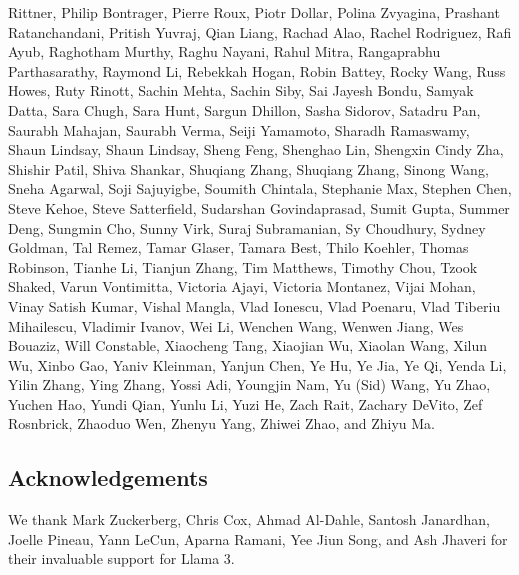 \documentclass[dvipsnames]{fairmeta}
\begin{document}
Rittner, Philip Bontrager, Pierre Roux, Piotr Dollar, Polina Zvyagina, Prashant Ratanchandani, Pritish Yuvraj, Qian Liang, Rachad Alao, Rachel Rodriguez, Rafi Ayub, Raghotham Murthy, Raghu Nayani, Rahul Mitra, Rangaprabhu Parthasarathy, Raymond Li, Rebekkah Hogan, Robin Battey, Rocky Wang, Russ Howes, Ruty Rinott, Sachin Mehta, Sachin Siby, Sai Jayesh Bondu, Samyak Datta, Sara Chugh, Sara Hunt, Sargun Dhillon, Sasha Sidorov, Satadru Pan, Saurabh Mahajan, Saurabh Verma, Seiji Yamamoto, Sharadh Ramaswamy, Shaun Lindsay, Shaun Lindsay, Sheng Feng, Shenghao Lin, Shengxin Cindy Zha, Shishir Patil, Shiva Shankar, Shuqiang Zhang, Shuqiang Zhang, Sinong Wang, Sneha Agarwal, Soji Sajuyigbe, Soumith Chintala, Stephanie Max, Stephen Chen, Steve Kehoe, Steve Satterfield, Sudarshan Govindaprasad, Sumit Gupta, Summer Deng, Sungmin Cho, Sunny Virk, Suraj Subramanian, Sy Choudhury, Sydney Goldman, Tal Remez, Tamar Glaser, Tamara Best, Thilo Koehler, Thomas Robinson, Tianhe Li, Tianjun Zhang, Tim Matthews, Timothy Chou, Tzook Shaked, Varun Vontimitta, Victoria Ajayi, Victoria Montanez, Vijai Mohan, Vinay Satish Kumar, Vishal Mangla, Vlad Ionescu, Vlad Poenaru, Vlad Tiberiu Mihailescu, Vladimir Ivanov, Wei Li, Wenchen Wang, Wenwen Jiang, Wes Bouaziz, Will Constable, Xiaocheng Tang, Xiaojian Wu, Xiaolan Wang, Xilun Wu, Xinbo Gao, Yaniv Kleinman, Yanjun Chen, Ye Hu, Ye Jia, Ye Qi, Yenda Li, Yilin Zhang, Ying Zhang, Yossi Adi, Youngjin Nam, Yu (Sid) Wang, Yu Zhao, Yuchen Hao, Yundi Qian, Yunlu Li, Yuzi He, Zach Rait, Zachary DeVito, Zef Rosnbrick, Zhaoduo Wen, Zhenyu Yang, Zhiwei Zhao, and Zhiyu Ma.

\subsection*{Acknowledgements}
We thank Mark Zuckerberg, Chris Cox, Ahmad Al-Dahle, Santosh Janardhan, Joelle Pineau, Yann LeCun, Aparna Ramani, Yee Jiun Song, and Ash Jhaveri for their invaluable support for Llama 3.
\end{document}

